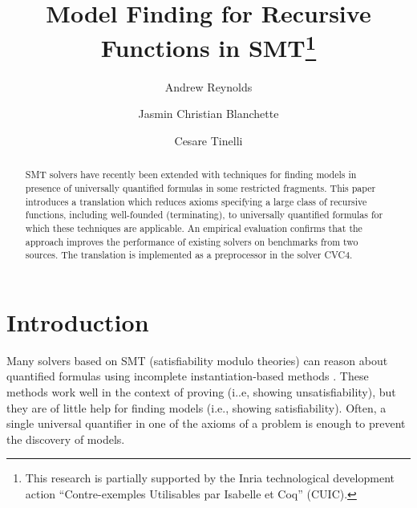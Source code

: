 \documentclass[runningheads,a4paper]{llncs}
\newcommand\cvc{CVC4\xspace}
\newcommand{\rem}[1]{\textcolor{red}{[#1]}}
\newcommand{\ct}[1]{\rem{#1 --ct}}
\begin{document}
\title{Model Finding for Recursive Functions in SMT\thanks{%
This research is partially supported by the Inria technological development
action ``Contre-exemples Utilisables par Isabelle et Coq'' (CUIC).
}
}

\author {Andrew Reynolds \and Jasmin Christian Blanchette \and Cesare Tinelli }

\maketitle

\begin{abstract}
SMT solvers have recently been extended with techniques for finding models
in presence of universally quantified formulas in some restricted fragments.
This paper introduces a translation which reduces axioms specifying a large
class of recursive functions, including well-founded (terminating),
to universally quantified formulas for which these
techniques are applicable.
An empirical evaluation confirms that the approach improves 
the performance of existing solvers on benchmarks from two sources. 
The translation is implemented as a preprocessor in the solver CVC4.
\end{abstract}

\setcounter{footnote}{0}

\section{Introduction}
\label{sec:introduction}


Many solvers based on SMT (satisfiability modulo theories) can reason about
quantified formulas using incomplete instantiation-based methods
\cite{MouraBjoerner07,ReynoldsTinelliMoura14}.
These methods work well in the context of proving (i..e, showing
unsatisfiability), but they are of little help for finding models (i.e.,
showing satisfiability). Often, a single universal quantifier in one of the
axioms of a problem is enough to prevent the discovery of models.
\end{document}
